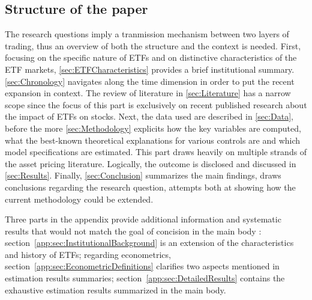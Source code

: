 \subsection{Structure of the paper}
The research questions imply a tranmission mechanism between two layers of trading, thus an overview of both the structure and the context is needed. First, focusing on the specific nature of ETFs and on distinctive characteristics of the ETF markets, \autoref{sec:ETFCharacteristics} provides a brief institutional summary. \autoref{sec:Chronology} navigates along the time dimension in order to put the recent expansion in context. The review of literature in \autoref{sec:Literature} has a narrow scope since the focus of this part is exclusively on recent published research about the impact of ETFs on stocks. Next, the data used are described in \autoref{sec:Data}, before the more \autoref{sec:Methodology} explicits how the key variables are computed, what the best-known theoretical explanations for various controls are and which model specifications are estimated. This part draws heavily on multiple strands of the asset pricing literature. Logically, the outcome is disclosed and discussed in \autoref{sec:Results}. Finally, \autoref{sec:Conclusion} summarizes the main findings, draws conclusions regarding the research question, attempts both at showing how the current methodology could be extended.

Three parts in the appendix provide additional information and systematic results that would not match the goal of concision in the main body : section~\autoref{app:sec:InstitutionalBackground} is an extension of the characteristics and history of ETFs; regarding econometrics, section~\autoref{app:sec:EconometricDefinitions} clarifies two aspects mentioned in estimation results summaries; section~\autoref{app:sec:DetailedResults} contains the exhaustive estimation results summarized in the main body.
